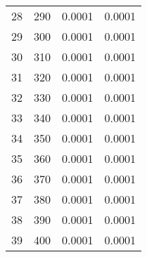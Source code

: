 \begin{table}
\begin{adjustbox}{width=1\textwidth/2}
\begin{tabular}{|c|c|c|c|}
\cline{1-4}
28 & 290 & 0.0001 & 0.0001 \\
\cline{1-4}
29 & 300 & 0.0001 & 0.0001 \\
\cline{1-4}
30 & 310 & 0.0001 & 0.0001 \\
\cline{1-4}
31 & 320 & 0.0001 & 0.0001 \\
\cline{1-4}
32 & 330 & 0.0001 & 0.0001 \\
\cline{1-4}
33 & 340 & 0.0001 & 0.0001 \\
\cline{1-4}
34 & 350 & 0.0001 & 0.0001 \\
\cline{1-4}
35 & 360 & 0.0001 & 0.0001 \\
\cline{1-4}
36 & 370 & 0.0001 & 0.0001 \\
\cline{1-4}
37 & 380 & 0.0001 & 0.0001 \\
\cline{1-4}
38 & 390 & 0.0001 & 0.0001 \\
\cline{1-4}
39 & 400 & 0.0001 & 0.0001 \\
\cline{1-4}
\end{tabular}
\end{adjustbox}
\end{table}

